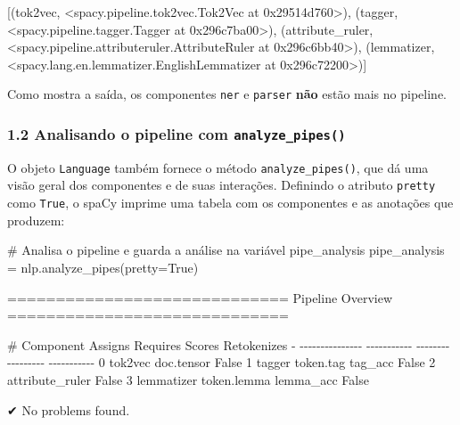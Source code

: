 \documentclass[
  brazilian,
  11pt,
]{article}
\newenvironment{Shaded}{\begin{snugshade}}{\end{snugshade}}
\newcommand{\CommentTok}[1]{\textcolor[rgb]{0.48,0.49,0.49}{#1}}
\newcommand{\NormalTok}[1]{\textcolor[rgb]{0.81,0.81,0.76}{#1}}
\newcommand{\OperatorTok}[1]{\textcolor[rgb]{0.81,0.81,0.76}{#1}}
\newcommand{\VariableTok}[1]{\textcolor[rgb]{0.15,0.68,0.68}{#1}}
\let\oldtexttt\texttt
\renewcommand{\texttt}[1]{{\color{inlink}\oldtexttt{#1}}}
\begin{document}
\begin{Shaded}
\begin{Highlighting}[]
\NormalTok{[(\textquotesingle{}tok2vec\textquotesingle{}, \textless{}spacy.pipeline.tok2vec.Tok2Vec at 0x29514d760\textgreater{}),}
\NormalTok{ (\textquotesingle{}tagger\textquotesingle{}, \textless{}spacy.pipeline.tagger.Tagger at 0x296c7ba00\textgreater{}),}
\NormalTok{ (\textquotesingle{}attribute\_ruler\textquotesingle{}, \textless{}spacy.pipeline.attributeruler.AttributeRuler at 0x296c6bb40\textgreater{}),}
\NormalTok{ (\textquotesingle{}lemmatizer\textquotesingle{}, \textless{}spacy.lang.en.lemmatizer.EnglishLemmatizer at 0x296c72200\textgreater{})]}
\end{Highlighting}
\end{Shaded}

Como mostra a saída, os componentes \texttt{ner} e \texttt{parser}
\textbf{não} estão mais no pipeline.

\subsubsection{\texorpdfstring{1.2 Analisando o pipeline com
\texttt{analyze\_pipes()}}{1.2 Analisando o pipeline com analyze\_pipes()}}\label{analisando-o-pipeline-com-analyze_pipes}

O objeto \texttt{Language} também fornece o método
\texttt{analyze\_pipes()}, que dá uma visão geral dos componentes e de
suas interações. Definindo o atributo \texttt{pretty} como
\texttt{True}, o spaCy imprime uma tabela com os componentes e as
anotações que produzem:

\begin{Shaded}
\begin{Highlighting}[]
\CommentTok{\# Analisa o pipeline e guarda a análise na variável \textquotesingle{}pipe\_analysis\textquotesingle{}}
\NormalTok{pipe\_analysis }\OperatorTok{=}\NormalTok{ nlp.analyze\_pipes(pretty}\OperatorTok{=}\VariableTok{True}\NormalTok{)}
\end{Highlighting}
\end{Shaded}

\begin{Shaded}
\begin{Highlighting}[]
\NormalTok{============================= Pipeline Overview =============================}

\NormalTok{\#   Component         Assigns       Requires   Scores      Retokenizes}
\NormalTok{{-}   {-}{-}{-}{-}{-}{-}{-}{-}{-}{-}{-}{-}{-}{-}{-}   {-}{-}{-}{-}{-}{-}{-}{-}{-}{-}{-}   {-}{-}{-}{-}{-}{-}{-}{-}   {-}{-}{-}{-}{-}{-}{-}{-}{-}   {-}{-}{-}{-}{-}{-}{-}{-}{-}{-}{-}}
\NormalTok{0   tok2vec           doc.tensor                           False}
\NormalTok{1   tagger            token.tag                tag\_acc     False}
\NormalTok{2   attribute\_ruler                                        False}
\NormalTok{3   lemmatizer        token.lemma              lemma\_acc   False}

\NormalTok{✔ No problems found.}
\end{Highlighting}
\end{Shaded}
\end{document}
